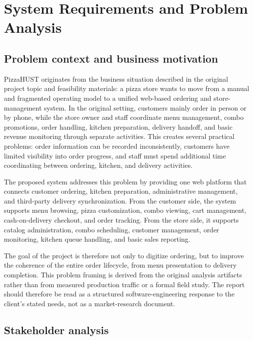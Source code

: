 \section{System Requirements and Problem Analysis}

\subsection{Problem context and business motivation}

PizzaHUST originates from the business situation described in the original project topic and feasibility materials: a pizza store wants to move from a manual and fragmented operating model to a unified web-based ordering and store-management system. In the original setting, customers mainly order in person or by phone, while the store owner and staff coordinate menu management, combo promotions, order handling, kitchen preparation, delivery handoff, and basic revenue monitoring through separate activities. This creates several practical problems: order information can be recorded inconsistently, customers have limited visibility into order progress, and staff must spend additional time coordinating between ordering, kitchen, and delivery activities.

The proposed system addresses this problem by providing one web platform that connects customer ordering, kitchen preparation, administrative management, and third-party delivery synchronization. From the customer side, the system supports menu browsing, pizza customization, combo viewing, cart management, cash-on-delivery checkout, and order tracking. From the store side, it supports catalog administration, combo scheduling, customer management, order monitoring, kitchen queue handling, and basic sales reporting.

The goal of the project is therefore not only to digitize ordering, but to improve the coherence of the entire order lifecycle, from menu presentation to delivery completion. This problem framing is derived from the original analysis artifacts rather than from measured production traffic or a formal field study. The report should therefore be read as a structured software-engineering response to the client's stated needs, not as a market-research document.

\subsection{Stakeholder analysis}

